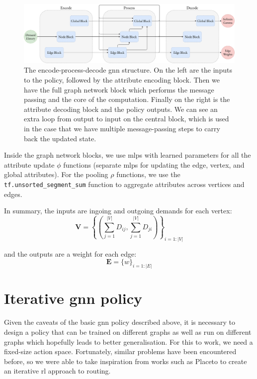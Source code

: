 \begin{figure}
    \centering
    \includegraphics[width=\textwidth]{figures/encode_process_decode.pdf}
    \caption{The encode-process-decode \ac{gnn} structure. On the left are the inputs to the policy, followed by the attribute encoding block. Then we have the full graph network block which performs the message passing and the core of the computation. Finally on the right is the attribute decoding block and the policy outputs. We can see an extra loop from output to input on the central block, which is used in the case that we have multiple message-passing steps to carry back the updated state.}
    \label{fig:encode_process_decode}
\end{figure}

Inside the graph network blocks, we use \acp{mlp} with learned parameters for all the attribute update $\phi$ functions (separate \acp{mlp} for updating the edge, vertex, and global attributes). For the pooling $\rho$ functions, we use the \texttt{tf.unsorted\_segment\_sum} function to aggregate attributes across vertices and edges.

In summary, the inputs are ingoing and outgoing demands for each vertex:
\begin{equation}
  \label{equation:node_inputs}
  \bm{V} = \left\{\left(\sum_{j=1}^{|V|}{D_{ij}}, \sum_{j=1}^{|V|}{D_{ji}}\right)\right\}_{i=1:|V|}
\end{equation}

and the outputs are a weight for each edge:
\begin{equation}
  \label{equation:edge_outputs}
  \bm{E} = \{w\}_{i=1:|E|}
\end{equation}


\section{Iterative \ac{gnn} policy}
\label{section:gnn_iterative}
Given the caveats of the basic \ac{gnn} policy described above, it is necessary to design a policy that can be trained on different graphs as well as run on different graphs which hopefully leads to better generalisation. For this to work, we need a fixed-size action space. Fortunately, similar problems have been encountered before, so we were able to take inspiration from works such as Placeto\cite{venkatakrishnan2019learning} to create an iterative \ac{rl} approach to routing.

